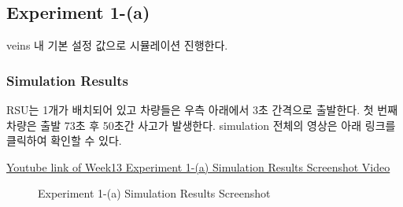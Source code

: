     
    \subsection*{Experiment 1-(a)}
        veins 내 기본 설정 값으로 시뮬레이션 진행한다.
        \subsubsection*{Simulation Results}
            RSU는 1개가 배치되어 있고 차량들은 우측 아래에서 3초 간격으로 출발한다. 첫 번째 차량은 출발 73초 후 50초간 사고가 발생한다. simulation 전체의 영상은 아래 링크를 클릭하여 확인할 수 있다.
            \vspace{-10mm}
                \begin{center}
                    \item \href{https://youtu.be/x1DFbwhNiEs}
        	        {Youtube link of Week13 Experiment 1-(a) Simulation Results Screenshot Video}
                \end{center}
            \vspace{-6mm}
            
            \begin{figure}[h!]
                \centering
                \hspace{3mm}
                \caption{Experiment 1-(a) Simulation Results Screenshot}
                \vspace{-2mm}
            \end{figure}
            
